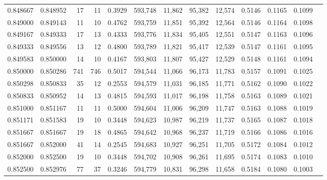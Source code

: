 \begin{tabular}{rrrrrrrrrrrrr}
0.848667 & 0.848952 &    17 &  11 &                                     0.3929 & 593,748 &  11,862 &  95,382 &  12,574 & 0.5146 & 0.1165 & 0.1099 \\
0.849000 & 0.849143 &    11 &  10 &                                     0.4762 & 593,759 &  11,851 &  95,392 &  12,564 & 0.5146 & 0.1164 & 0.1098 \\
0.849167 & 0.849333 &    17 &  13 &                                     0.4333 & 593,776 &  11,834 &  95,405 &  12,551 & 0.5147 & 0.1163 & 0.1096 \\
0.849333 & 0.849556 &    13 &  12 &                                     0.4800 & 593,789 &  11,821 &  95,417 &  12,539 & 0.5147 & 0.1161 & 0.1095 \\
0.849583 & 0.850000 &    14 &  10 &                                     0.4167 & 593,803 &  11,807 &  95,427 &  12,529 & 0.5148 & 0.1161 & 0.1094 \\
0.850000 & 0.850286 &   741 & 746 &                                     0.5017 & 594,544 &  11,066 &  96,173 &  11,783 & 0.5157 & 0.1091 & 0.1025 \\
0.850298 & 0.850833 &    35 &  12 &                                     0.2553 & 594,579 &  11,031 &  96,185 &  11,771 & 0.5162 & 0.1090 & 0.1022 \\
0.850833 & 0.850952 &    14 &  13 &                                     0.4815 & 594,593 &  11,017 &  96,198 &  11,758 & 0.5163 & 0.1089 & 0.1021 \\
0.851000 & 0.851167 &    11 &  11 &                                     0.5000 & 594,604 &  11,006 &  96,209 &  11,747 & 0.5163 & 0.1088 & 0.1019 \\
0.851171 & 0.851583 &    19 &  10 &                                     0.3448 & 594,623 &  10,987 &  96,219 &  11,737 & 0.5165 & 0.1087 & 0.1018 \\
0.851667 & 0.851667 &    19 &  18 &                                     0.4865 & 594,642 &  10,968 &  96,237 &  11,719 & 0.5166 & 0.1086 & 0.1016 \\
0.851667 & 0.852000 &    41 &  14 &                                     0.2545 & 594,683 &  10,927 &  96,251 &  11,705 & 0.5172 & 0.1084 & 0.1012 \\
0.852000 & 0.852500 &    19 &  10 &                                     0.3448 & 594,702 &  10,908 &  96,261 &  11,695 & 0.5174 & 0.1083 & 0.1010 \\
0.852500 & 0.852976 &    77 &  37 &                                     0.3246 & 594,779 &  10,831 &  96,298 &  11,658 & 0.5184 & 0.1080 & 0.1003 \\

\end{tabular}

